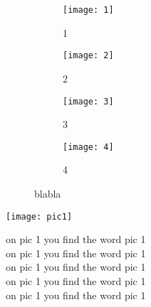 \documentclass{article}
\begin{document}
\blindtext
\begin{figure}[h]
    \begin{subfigure}[t]{0.46\textwidth}
        \texttt{[image: 1]}
        \caption{1}
    \end{subfigure}\hfill
    \begin{subfigure}[t]{0.46\textwidth}
        \texttt{[image: 2]}
        \caption{2}
    \end{subfigure}%

    \begin{subfigure}[t]{0.46\textwidth}
        \texttt{[image: 3]}
        \caption{3}
    \end{subfigure}\hfill
    \begin{subfigure}[t]{0.46\textwidth}
        \texttt{[image: 4]}
        \caption{4}
    \end{subfigure}%
    \caption{blabla}
\end{figure}
\blindtext
\begin{minipage}{0.5\textwidth}
\texttt{[image: pic1]}
\end{minipage}
\begin{minipage}{0.5\textwidth}
on pic 1 you find the word pic 1\\
on pic 1 you find the word pic 1\\
on pic 1 you find the word pic 1\\
on pic 1 you find the word pic 1\\
on pic 1 you find the word pic 1\ \vspace{2.5cm}\\
\end{minipage}
\end{document}
